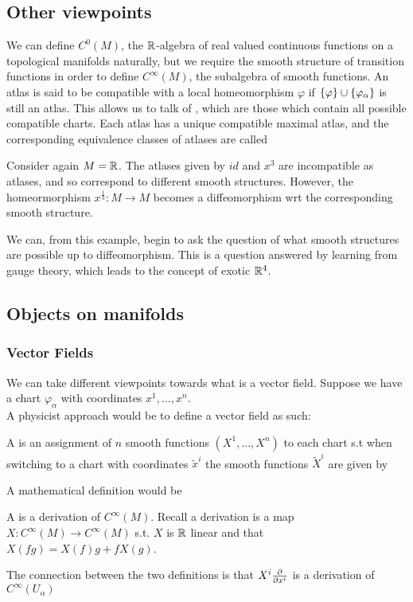 \documentclass{article}
\begin{document}
\subsection{Other viewpoints}
We can define $C^0(M)$, the $\mathbb{R}$-algebra of real valued continuous functions on a topological manifolds naturally, but we require the smooth structure of transition functions in order to define $C^\infty(M)$, the subalgebra of smooth functions. An atlas is said to be compatible with a local homeomorphism $\varphi$ if $\left\{ \varphi \right\} \cup \left\{ \varphi_\alpha \right\}$ is still an atlas. This allows us to talk of , which are those which contain all possible compatible charts. Each atlas has a unique compatible maximal atlas, and the corresponding equivalence classes of atlases are called 

\begin{example}
Consider again $M = \mathbb{R}$. The atlases given by $id$ and $x^3$ are incompatible as atlases, and so correspond to different smooth structures. However, the homeormorphism $x^\frac{1}{3}:M \to M$ becomes a diffeomorphism wrt the corresponding smooth structure.
\end{example}
We can, from this example, begin to ask the question of what smooth structures are possible up to diffeomorphism. This is a question answered by learning from gauge theory, which leads to the concept of exotic $\mathbb{R}^4$. 

\subsection{Objects on manifolds}

\subsubsection{Vector Fields}
We can take different viewpoints towards what is a vector field. Suppose we have a chart $\varphi_\alpha$ with coordinates $x^1, \dots, x^n$. \\
A physicist approach would be to define a vector field as such:
\begin{definition}
A  is an assignment of $n$ smooth functions $(X^1, \dots, X^n)$ to each chart s.t when switching to a chart with coordinates $\tilde{x}^i$ the smooth functions $\tilde{X}^i$ are given by 
\end{definition}
A mathematical definition would be
\begin{definition}
 A  is a derivation of $C^\infty(M)$. Recall a derivation is a map $X:C^\infty(M) \to C^\infty(M)$ s.t. $X$ is $\mathbb{R}$ linear and that $X(fg) = X(f)g + fX(g)$. 
 \end{definition}
The connection between the two definitions is that $X^i \frac{\partial}{\partial x^i}$ is a derivation of $C^\infty(U_\alpha)$
\end{document}
